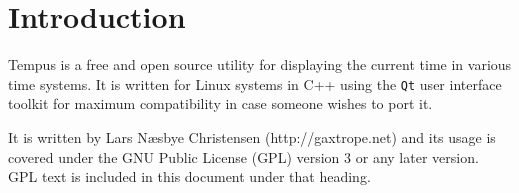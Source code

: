 \section{Introduction}
Tempus is a free and open source utility for displaying the current time in various time systems. It is written for Linux systems in C++ using the \texttt{Qt} user interface toolkit for maximum compatibility in case someone wishes to port it.

It is written by Lars N{\ae}sbye Christensen (http://gaxtrope.net) and its usage is covered under the GNU Public License (GPL) version 3 or any later version. GPL text is included in this document under that heading.


